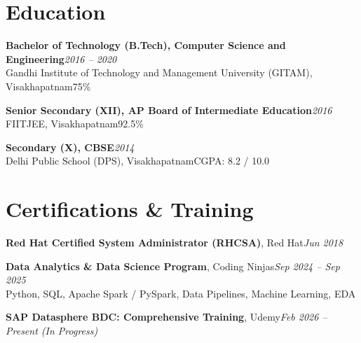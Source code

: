 \documentclass[10pt, letterpaper]{article}
\begin{document}
\section{Education}

{\bfseries Bachelor of Technology (B.Tech), Computer Science and Engineering}\hfill{\small\color{muted}\textit{2016 -- 2020}}\\
{\small\color{muted}Gandhi Institute of Technology and Management University (GITAM), Visakhapatnam\hfill 75\%}

\vspace{2pt}
{\bfseries Senior Secondary (XII), AP Board of Intermediate Education}\hfill{\small\color{muted}\textit{2016}}\\
{\small\color{muted}FIITJEE, Visakhapatnam\hfill 92.5\%}

\vspace{2pt}
{\bfseries Secondary (X), CBSE}\hfill{\small\color{muted}\textit{2014}}\\
{\small\color{muted}Delhi Public School (DPS), Visakhapatnam\hfill CGPA: 8.2 / 10.0}

\section{Certifications \& Training}

{\bfseries Red Hat Certified System Administrator (RHCSA)}, Red Hat\hfill{\small\color{muted}\textit{Jun 2018}}

\vspace{1pt}
{\bfseries Data Analytics \& Data Science Program}, Coding Ninjas\hfill{\small\color{muted}\textit{Sep 2024 -- Sep 2025}}\\
{\small\color{muted}Python, SQL, Apache Spark / PySpark, Data Pipelines, Machine Learning, EDA}

\vspace{1pt}
{\bfseries SAP Datasphere BDC: Comprehensive Training}, Udemy\hfill{\small\color{muted}\textit{Feb 2026 -- Present \emph{(In Progress)}}}

\end{document}
